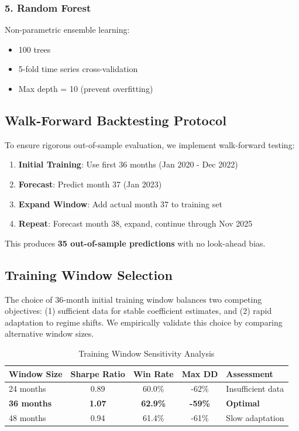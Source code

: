 \documentclass[12pt,a4paper]{article}
\begin{document}
\subsubsection{5. Random Forest}

Non-parametric ensemble learning:

\begin{itemize}
    \item 100 trees
    \item 5-fold time series cross-validation
    \item Max depth = 10 (prevent overfitting)
\end{itemize}

\subsection{Walk-Forward Backtesting Protocol}

To ensure rigorous out-of-sample evaluation, we implement walk-forward testing:

\begin{enumerate}
    \item \textbf{Initial Training}: Use first 36 months (Jan 2020 - Dec 2022)

    \item \textbf{Forecast}: Predict month 37 (Jan 2023)

    \item \textbf{Expand Window}: Add actual month 37 to training set

    \item \textbf{Repeat}: Forecast month 38, expand, continue through Nov 2025
\end{enumerate}

This produces \textbf{35 out-of-sample predictions} with no look-ahead bias.

\subsection{Training Window Selection}

The choice of 36-month initial training window balances two competing objectives: (1) sufficient data for stable coefficient estimates, and (2) rapid adaptation to regime shifts. We empirically validate this choice by comparing alternative window sizes.

\begin{table}[H]
\centering
\caption{Training Window Sensitivity Analysis}
\label{tab:training_windows}
\begin{tabular}{@{}lcccl@{}}
\toprule
\textbf{Window Size} & \textbf{Sharpe Ratio} & \textbf{Win Rate} & \textbf{Max DD} & \textbf{Assessment} \\
\midrule
24 months & 0.89 & 60.0\% & -62\% & Insufficient data \\
\textbf{36 months} & \textbf{1.07} & \textbf{62.9\%} & \textbf{-59\%} & \textbf{Optimal} \\
48 months & 0.94 & 61.4\% & -61\% & Slow adaptation \\
\bottomrule
\end{tabular}
\end{table}
\end{document}
